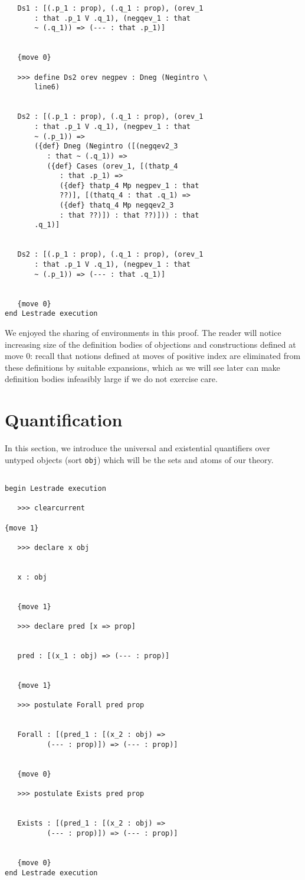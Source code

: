\documentclass[12pt]{article}
\begin{document}
\begin{verbatim}
   Ds1 : [(.p_1 : prop), (.q_1 : prop), (orev_1 
       : that .p_1 V .q_1), (negqev_1 : that 
       ~ (.q_1)) => (--- : that .p_1)]


   {move 0}

   >>> define Ds2 orev negpev : Dneg (Negintro \
       line6)


   Ds2 : [(.p_1 : prop), (.q_1 : prop), (orev_1 
       : that .p_1 V .q_1), (negpev_1 : that 
       ~ (.p_1)) => 
       ({def} Dneg (Negintro ([(negqev2_3 
          : that ~ (.q_1)) => 
          ({def} Cases (orev_1, [(thatp_4 
             : that .p_1) => 
             ({def} thatp_4 Mp negpev_1 : that 
             ??)], [(thatq_4 : that .q_1) => 
             ({def} thatq_4 Mp negqev2_3 
             : that ??)]) : that ??)])) : that 
       .q_1)]


   Ds2 : [(.p_1 : prop), (.q_1 : prop), (orev_1 
       : that .p_1 V .q_1), (negpev_1 : that 
       ~ (.p_1)) => (--- : that .q_1)]


   {move 0}
end Lestrade execution
\end{verbatim}

We enjoyed the sharing of environments in this proof.  The reader will notice increasing size of the definition bodies of objections and constructions defined at move 0:  recall that notions defined at moves of positive index are eliminated from these definitions by suitable expansions, which as we will see later can make definition bodies infeasibly large if we do not exercise care.


\section{Quantification}

In this section, we introduce the universal and existential quantifiers over untyped objects (sort {\tt obj}) which will be the sets and atoms of our theory.

\begin{verbatim}

begin Lestrade execution

   >>> clearcurrent

{move 1}

   >>> declare x obj


   x : obj


   {move 1}

   >>> declare pred [x => prop]


   pred : [(x_1 : obj) => (--- : prop)]


   {move 1}

   >>> postulate Forall pred prop


   Forall : [(pred_1 : [(x_2 : obj) => 
          (--- : prop)]) => (--- : prop)]


   {move 0}

   >>> postulate Exists pred prop


   Exists : [(pred_1 : [(x_2 : obj) => 
          (--- : prop)]) => (--- : prop)]


   {move 0}
end Lestrade execution
\end{verbatim}
\end{document}
